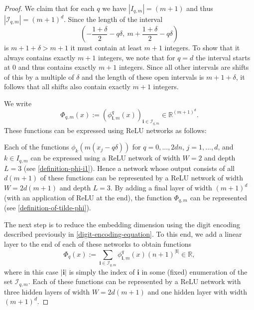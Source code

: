 \documentclass[twoside,11pt]{article}
\begin{document}
\begin{proof}
    We claim that for each $q$ we have $|I_{q,m}| = (m+1)$ and thus $|\mathcal{I}_{q,m}| = (m+1)^d$. Since the length of the interval
    \begin{equation}\label{interval-equation}
        \left(-\frac{1+\delta}{2} - q\delta,~m + \frac{1+\delta}{2}-q\delta\right)
    \end{equation}
    is $m+1+\delta > m+1$ it must contain at least $m+1$ integers. To show that it always contains exactly $m+1$ integers, we note that for $q = d$ the interval starts at $0$ and thus contains exactly $m+1$ integers. Since all other intervals are shifts of this by a multiple of $\delta$ and the length of these open intervals is $m+1+\delta$, it follows that all shifts also contain exactly $m+1$ integers. 
    
    We write
    \begin{equation}\label{Phi-q,m-equation}
        \Phi_{q,m}(x) := (\phi^q_{\textbf{i},m}(x))_{\textbf{i}\in\mathcal{I}_{q,m}}\in \mathbb{R}^{(m+1)^d}.
    \end{equation}
    These functions can be expressed using ReLU networks as follows:
    
    Each of the functions $\phi_k(m(x_j - q\delta))$ for $q=0,...,2dn$, $j=1,...,d$, and $k\in I_{q,m}$ can be expressed using a ReLU network of width $W = 2$ and depth $L = 3$ (see \eqref{definition-phi-i1}). Hence a network whose output consists of all $d(m+1)$ of these functions can be represented by a ReLU network of width $W = 2d(m+1)$ and depth $L = 3$. By adding a final layer of width $(m+1)^d$ (with an application of ReLU at the end), the function $\Phi_{q,m}$ can be represented (see \eqref{definition-of-tilde-phi}).

    The next step is to reduce the embedding dimension using the digit encoding described previously in \eqref{digit-encoding-equation}. To this end, we add a linear layer to the end of each of these networks to obtain functions
    \begin{equation}
        \Phi_{q}(x) := \sum_{\textbf{i}\in\mathcal{I}_{q,m}} \phi^q_{\textbf{i},m}(x)(n+1)^{|\textbf{i}|} \in \mathbb{R},
    \end{equation}
    where in this case $|\textbf{i}|$ is simply the index of $\textbf{i}$ in some (fixed) enumeration of the set $\mathcal{I}_{q,m}$. Each of these functions can be represented by a ReLU network with three hidden layers of width $W = 2d(m+1)$ and one hidden layer with width $(m+1)^d$.
    

\end{proof}
\end{document}
